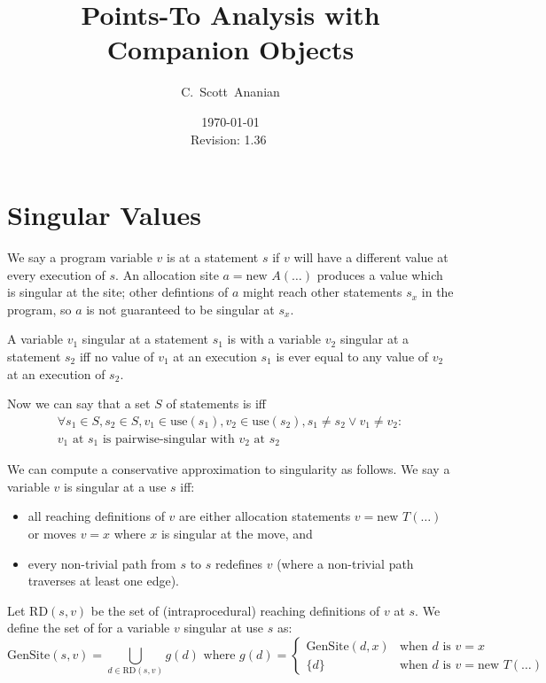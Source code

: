 \documentclass[11pt,notitlepage]{article}
\author{C.~Scott~Ananian}
\title{Points-To Analysis with Companion Objects}
\date{\today \\ $ $Revision: 1.36 $ $}
\begin{document}

\maketitle
\section{Singular Values}

We say a program variable $v$ is  at a statement $s$
if $v$ will have a different value at every execution of $s$.  An
allocation site $a = \text{new }A(\ldots)$ produces a value which is singular
at the site; other defintions of $a$ might reach other statements
$s_x$ in the program, so $a$ is not guaranteed to be singular at $s_x$.

A variable $v_1$ singular at a statement $s_1$ is
 with a variable $v_2$ singular at a statement
$s_2$ iff no value of $v_1$ at an execution $s_1$ is ever equal to any
value of $v_2$ at an execution of $s_2$.

Now we can say that a set $S$ of statements is
 iff
\begin{multline*}
\forall s_1 \in S, s_2 \in S, v_1 \in \text{use}(s_1), v_2 \in \text{use}(s_2),
  s_1 \neq s_2 \vee v_1 \neq v_2:
\\
v_1 \text{ at } s_1 \text{ is pairwise-singular with } v_2 \text{ at } s_2
\end{multline*}

We can compute a conservative approximation to singularity as follows.
We say a variable $v$ is singular at a use $s$ iff:
\begin{itemize}
\item all reaching definitions of $v$ are either allocation statements 
$v = \text{new }T(\ldots)$ or moves $v = x$ where $x$ is singular at
the move, and
\item every non-trivial path from $s$ to $s$ redefines $v$ (where a
  non-trivial path traverses at least one edge).
\end{itemize}

Let $\text{RD}(s,v)$ be the set of (intraprocedural) reaching
definitions
of $v$ at $s$.
We define the set of  for a variable $v$ singular at
use $s$ as:
\begin{displaymath}
\text{GenSite}(s,v) %
 =
\bigcup_{d \in \text{RD}(s,v)} g(d)
\text{ where }
g(d) = \begin{cases}
                \text{GenSite}(d,x) &\text{when } d \text{ is } v=x \\
                \{d\}&\text{when } d \text{ is } v=\text{new } T(\ldots)
       \end{cases}
\end{displaymath}
\end{document}
